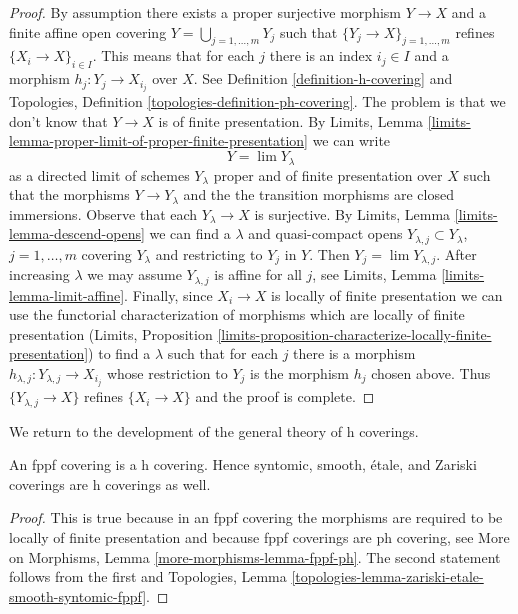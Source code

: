 \begin{proof}
By assumption there exists a proper surjective morphism
$Y \to X$ and a finite affine open covering
$Y = \bigcup_{j = 1, \ldots, m} Y_j$ such that
$\{Y_j \to X\}_{j = 1, \ldots, m}$ refines $\{X_i \to X\}_{i \in I}$.
This means that for each $j$ there is an index $i_j \in I$
and a morphism $h_j : Y_j \to X_{i_j}$ over $X$.
See Definition \ref{definition-h-covering} and
Topologies, Definition \ref{topologies-definition-ph-covering}.
The problem is that we don't know that $Y \to X$ is of finite
presentation.
By
Limits, Lemma \ref{limits-lemma-proper-limit-of-proper-finite-presentation}
we can write
$$
Y = \lim Y_\lambda
$$
as a directed limit of schemes $Y_\lambda$ proper and of finite presentation
over $X$ such that the morphisms $Y \to Y_\lambda$ and the
the transition morphisms are closed immersions. Observe that
each $Y_\lambda \to X$ is surjective.
By Limits, Lemma \ref{limits-lemma-descend-opens}
we can find a $\lambda$ and quasi-compact opens
$Y_{\lambda, j} \subset Y_\lambda$, $j = 1, \ldots, m$
covering $Y_\lambda$ and restricting to $Y_j$ in $Y$.
Then $Y_j = \lim Y_{\lambda, j}$.
After increasing $\lambda$ we may assume $Y_{\lambda, j}$
is affine for all $j$, see
Limits, Lemma \ref{limits-lemma-limit-affine}.
Finally, since $X_i \to X$ is locally of finite presentation
we can use the functorial characterization of morphisms
which are locally of finite presentation
(Limits, Proposition
\ref{limits-proposition-characterize-locally-finite-presentation})
to find a $\lambda$ such that for each $j$ there is
a morphism $h_{\lambda, j} : Y_{\lambda, j} \to X_{i_j}$
whose restriction to $Y_j$ is the morphism $h_j$ chosen above.
Thus $\{Y_{\lambda, j} \to X\}$ refines
$\{X_i \to X\}$ and the proof is complete.
\end{proof}

\noindent
We return to the development of the general theory of h coverings.

\begin{lemma}
\label{lemma-zariski-h}
An fppf covering is a h covering. Hence syntomic, smooth, \'etale,
and Zariski coverings are h coverings as well.
\end{lemma}

\begin{proof}
This is true because in an fppf covering the morphisms are
required to be locally of finite presentation and because
fppf coverings are ph covering, see More on Morphisms,
Lemma \ref{more-morphisms-lemma-fppf-ph}.
The second statement follows from the first and
Topologies, Lemma \ref{topologies-lemma-zariski-etale-smooth-syntomic-fppf}.
\end{proof}

